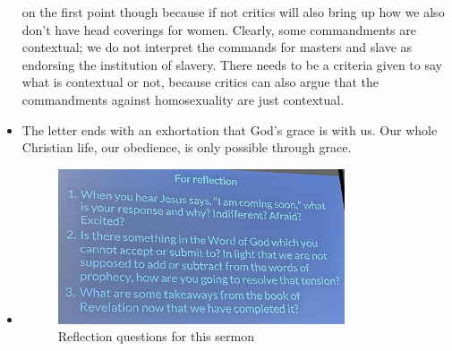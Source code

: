 \begin{itemize}
{{  on the first point though because if not critics will also bring up how we
  also don't have head coverings for women. Clearly, some commandments are
  contextual; we do not interpret the commands for masters and slave as
  endorsing the institution of slavery. There needs to be a criteria given to
  say what is contextual or not, because critics can also argue that the
  commandments against homosexuality are just contextual. }}
  \item{The letter ends with an exhortation that God's grace is with us. Our whole Christian life, our obedience, is only possible through grace. }
  \item{\begin{figure}[H]
    \centering
    \includegraphics[width=0.8\textwidth, trim={0cm 0cm 0cm 0cm},clip]{Figures/maySermon2Reflections.jpg}
    \caption[]{Reflection questions for this sermon}
  \end{figure}}
\end{itemize}